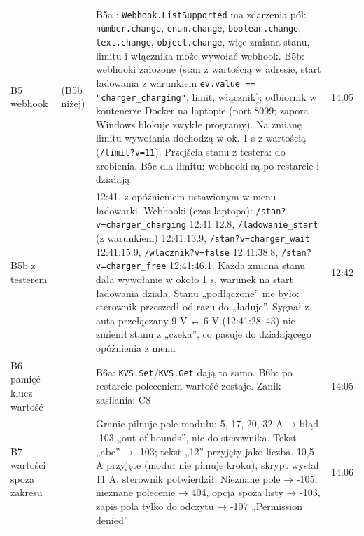 \documentclass[11pt,a4paper]{article}
\begin{document}
\begin{longtable}{>{\raggedright\arraybackslash}p{3.00cm}>{\raggedright\arraybackslash}p{2.62cm}>{\raggedright\arraybackslash}p{7.10cm}>{\raggedright\arraybackslash}p{2.11cm}}
B5 webhook & \leavevmode{\symbolfont\color{apgreen}\textbf{✔}} (B5b niżej) & B5a \leavevmode{\symbolfont\color{apgreen}\textbf{✔}}: \texttt{Webhook.\allowbreak{}ListSupported} ma zdarzenia pól: \texttt{number.\allowbreak{}change}, \texttt{enum.change}, \texttt{boolean.\allowbreak{}change}, \texttt{text.change}, \texttt{object.\allowbreak{}change}, więc zmiana stanu, limitu i włącznika może wywołać webhook. B5b: webhooki założone (stan z wartością w adresie, start ładowania z warunkiem \texttt{ev.\allowbreak{}value == "charger\_\allowbreak{}charging"}, limit, włącznik); odbiornik w kontenerze Docker na laptopie (port 8099; zapora Windows blokuje zwykłe programy). Na zmianę limitu wywołania dochodzą w ok. 1 s z wartością (\texttt{/limit?v=11}). Przejścia stanu z testera: do zrobienia. B5c \leavevmode{\symbolfont\color{apgreen}\textbf{✔}} dla limitu: webhooki są po restarcie i działają & 29.09 14:05 \\
B5b z testerem & \leavevmode{\symbolfont\color{apgreen}\textbf{✔}} & 30.09 12:41, z opóźnieniem ustawionym w menu ładowarki. Webhooki (czas laptopa): \texttt{/\allowbreak{}stan?v=charger\_\allowbreak{}charging} 12:41:12.8, \texttt{/\allowbreak{}ladowanie\_\allowbreak{}start} (z warunkiem) 12:41:13.9, \texttt{/\allowbreak{}stan?v=charger\_\allowbreak{}wait} 12:41:15.9, \texttt{/\allowbreak{}wlacznik?v=false} 12:41:38.8, \texttt{/\allowbreak{}stan?v=charger\_\allowbreak{}free} 12:41:46.1. Każda zmiana stanu dała wywołanie w około 1 s, warunek na start ładowania działa. Stanu „podłączone” nie było: sterownik przeszedł od razu do „ładuje”. Sygnał z auta przełączany 9 V {\symbolfont↔} 6 V (12:41:28–43) nie zmienił stanu z „czeka”, co pasuje do działającego opóźnienia z menu & 30.09 12:42 \\
B6 pamięć klucz-wartość & \leavevmode{\symbolfont\color{apgreen}\textbf{✔}} & B6a: \texttt{KVS.Set}/\texttt{KVS.Get} dają to samo. B6b: po restarcie poleceniem wartość zostaje. Zanik zasilania: C8 & 29.09 14:05 \\
B7 wartości spoza zakresu & \leavevmode{\symbolfont\color{apgreen}\textbf{✔}} & Granic pilnuje pole modułu: 5, 17, 20, 32 A {\symbolfont→} błąd -103 „out of bounds”, nic do sterownika. Tekst „abc” {\symbolfont→} -103; tekst „12” przyjęty jako liczba. 10,5 A przyjęte (moduł nie pilnuje kroku), skrypt wysłał 11 A, sterownik potwierdził. Nieznane pole {\symbolfont→} -105, nieznane polecenie {\symbolfont→} 404, opcja spoza listy {\symbolfont→} -103, zapis pola tylko do odczytu {\symbolfont→} -107 „Permission denied” & 29.09 14:06 \\

\end{longtable}
\end{document}
